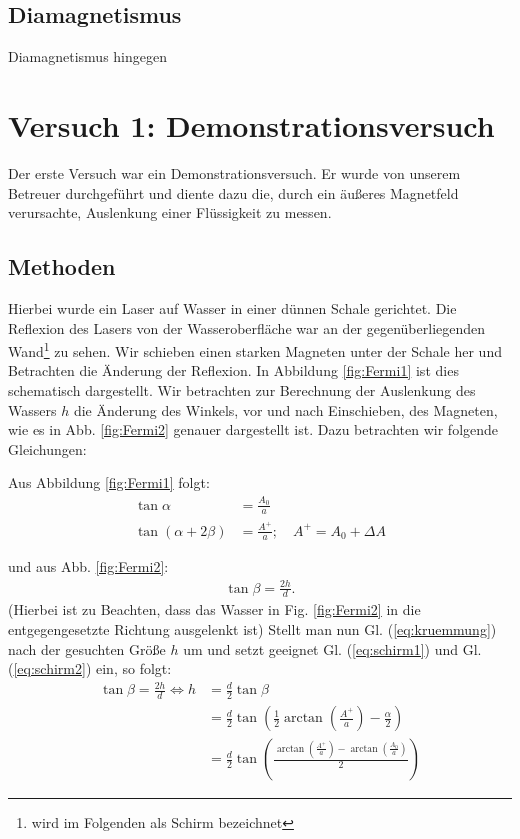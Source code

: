 \documentclass[11pt,a4paper,titlepage, ngerman]{article}
\newcommand{\refeq}[1]{Gl. (\ref{eq:#1})}
\newcommand{\reffig}[1]{Fig. \ref{fig:#1}}
\begin{document}
			
		\subsection{Diamagnetismus}
		
			Diamagnetismus hingegen %
			
			
	\section{Versuch 1: Demonstrationsversuch} 
		
		Der erste Versuch war ein Demonstrationsversuch. Er wurde von unserem Betreuer durchgeführt und diente dazu die, durch ein äußeres Magnetfeld verursachte, Auslenkung einer Flüssigkeit zu messen.
		
		\subsection*{Methoden} 
		
		Hierbei wurde ein Laser auf Wasser in einer dünnen Schale gerichtet. Die Reflexion des Lasers von der Wasseroberfläche war an der gegenüberliegenden Wand\footnote{wird im Folgenden als Schirm bezeichnet} zu sehen. Wir schieben einen starken Magneten unter der Schale her und Betrachten die Änderung der Reflexion.
		In Abbildung \ref{fig:Fermi1} ist dies schematisch dargestellt. Wir betrachten zur Berechnung der Auslenkung des Wassers $h$ die Änderung des Winkels, vor und nach Einschieben, des Magneten, wie es in Abb. \ref{fig:Fermi2} genauer dargestellt ist. Dazu betrachten wir folgende Gleichungen:
		
		Aus Abbildung \ref{fig:Fermi1} folgt:
		\begin{align}
			\tan \alpha &= \frac{A_0}{a}
			\label{eq:schirm1}\\
			\tan (\alpha + 2 \beta) &= \frac{A^+}{a};\quad A^+ = A_0+\Delta A
			\label{eq:schirm2}
		\end{align}
		
		und aus Abb. \ref{fig:Fermi2}: 
			\begin{align}
			\tan \beta = \frac{2 h}{d}.
			\label{eq:kruemmung}
		\end{align}
		(Hierbei ist zu Beachten, dass das Wasser in \reffig{Fermi2} in die entgegengesetzte Richtung ausgelenkt ist)										
		Stellt man nun \refeq{kruemmung} nach der gesuchten Größe $h$ um und setzt geeignet \refeq{schirm1} und \refeq{schirm2} ein, so folgt:	
		\begin{align}
			\tan \beta = \frac{2h}{d} \Leftrightarrow h &= \frac{d}{2} \tan \beta\\
			&= \frac{d}{2} \tan \left( \frac{1}{2}\arctan \left( \frac{A^+}{a}\right) - \frac{\alpha}{2}\right)\\
			&= \frac{d}{2} \tan \left( \frac{\arctan \left( \frac{A^+}{a}\right) - \arctan\left( \frac{A_0}{a}\right)}{2} \right) \label{eq:auslenkung}
		\end{align}
		
\end{document}
